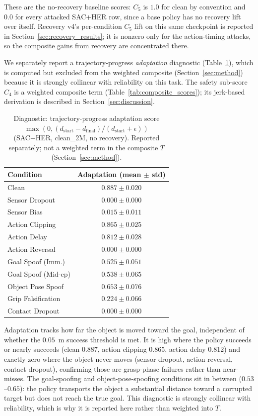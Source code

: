 \documentclass[conference]{IEEEtran}
\begin{document}
These are the no-recovery baseline scores: $C_5$ is $1.0$ for clean by convention and
$0.0$ for every attacked SAC+HER row, since a base policy has no recovery lift over
itself. Recovery v4's per-condition $C_5$ lift on this same checkpoint is reported in
Section~\ref{sec:recovery_results}; it is nonzero only for the action-timing attacks, so
the composite gains from recovery are concentrated there.

We separately report a trajectory-progress \emph{adaptation} diagnostic
(Table~\ref{tab:adaptation_diagnostic}), which is computed but excluded from the weighted
composite (Section~\ref{sec:method}) because it is strongly collinear with reliability on
this task. The safety sub-score $C_4$ is a weighted composite term (Table~\ref{tab:composite_scores});
its jerk-based derivation is described in Section~\ref{sec:discussion}.

\begin{table}[t]
\centering
\caption{Diagnostic: trajectory-progress adaptation score
$\max(0,(d_{\mathrm{start}}-d_{\mathrm{final}})/(d_{\mathrm{start}}+\epsilon))$ (SAC+HER,
clean\_2M, no recovery). Reported separately; not a weighted term in the composite $T$
(Section~\ref{sec:method}).}
\label{tab:adaptation_diagnostic}
\begin{tabular}{lc}
\toprule
\textbf{Condition} & \textbf{Adaptation (mean $\pm$ std)} \\
\midrule
Clean               & $0.887 \pm 0.020$ \\
Sensor Dropout       & $0.000 \pm 0.000$ \\
Sensor Bias          & $0.015 \pm 0.011$ \\
Action Clipping      & $0.865 \pm 0.025$ \\
Action Delay         & $0.812 \pm 0.028$ \\
Action Reversal      & $0.000 \pm 0.000$ \\
Goal Spoof (Imm.)    & $0.525 \pm 0.051$ \\
Goal Spoof (Mid-ep)  & $0.538 \pm 0.065$ \\
Object Pose Spoof    & $0.653 \pm 0.076$ \\
Grip Falsification   & $0.224 \pm 0.066$ \\
Contact Dropout      & $0.000 \pm 0.000$ \\
\bottomrule
\end{tabular}
\end{table}

Adaptation tracks how far the object is moved toward the goal, independent of whether the
$0.05$~m success threshold is met. It is high where the policy succeeds or nearly
succeeds (clean $0.887$, action clipping $0.865$, action delay $0.812$) and exactly zero
where the object never moves (sensor dropout, action reversal, contact dropout),
confirming those are grasp-phase failures rather than near-misses. The goal-spoofing and
object-pose-spoofing conditions sit in between ($0.53$--$0.65$): the policy transports the
object a substantial distance toward a corrupted target but does not reach the true goal.
This diagnostic is strongly collinear with reliability, which is why it is reported here
rather than weighted into $T$.
\end{document}

